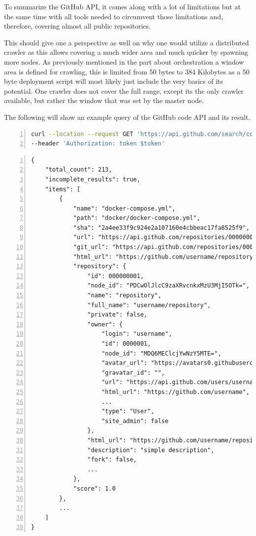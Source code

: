 To summarize the GitHub API, it comes along with a lot of limitations but at the same time with all tools needed to circumvent those limitations and, therefore, covering almost all public repositories.

This should give one a perspective as well on why one would utilize a distributed crawler as this allows covering a much wider area and much quicker by spawning more nodes. As previously mentioned in the part about orchestration a window area is defined for crawling, this is limited from 50 bytes to 384 Kilobytes as a 50 byte deployment script will most likely just include the very basics of its potential. One crawler does not cover the full range, except its the only crawler available, but rather the window that was set by the master node.

The following will show an example query of the GitHub code API and its result.
\begin{lstlisting}[language=bash, caption=GitHub Request, breaklines=true, label=lst:github_request, numbers=left,  basicstyle=\footnotesize\singlespacing]
curl --location --request GET 'https://api.github.com/search/code?q=filename:docker-compose.yml+size=1234&page=1&per_page=100&order=asc&sort=indexed' \
--header 'Authorization: token $token'
\end{lstlisting}
\begin{lstlisting}[caption=GitHub Response, breaklines=true, label=lst:github_response, numbers=left,  basicstyle=\footnotesize\singlespacing]
{
    "total_count": 213,
    "incomplete_results": true,
    "items": [
        {
            "name": "docker-compose.yml",
            "path": "docker/docker-compose.yml",
            "sha": "2a4ee33f9c924e2a107160e4cbbeac17fa8525f9",
            "url": "https://api.github.com/repositories/000000001/contents/docker/docker-compose.yml?ref=f657460284d463a2792f35f50728c74b9a52504e",
            "git_url": "https://api.github.com/repositories/000000001/git/blobs/2a4ee33f9c924e2a107160e4cbbeac17fa8525f9",
            "html_url": "https://github.com/username/repository/blob/f657460284d463a2792f35f50728c74b9a52504e/docker/docker-compose.yml",
            "repository": {
                "id": 000000001,
                "node_id": "PDCwOlJlcC9zaXRvcnkxMzU3MjI5OTk=",
                "name": "repository",
                "full_name": "username/repository",
                "private": false,
                "owner": {
                    "login": "username",
                    "id": 0000001,
                    "node_id": "MDQ6MEClcjYwNzY5MTE=",
                    "avatar_url": "https://avatars0.githubusercontent.com/u/0000001?v=4",
                    "gravatar_id": "",
                    "url": "https://api.github.com/users/username",
                    "html_url": "https://github.com/username",
                    ...
                    "type": "User",
                    "site_admin": false
                },
                "html_url": "https://github.com/username/repository",
                "description": "simple description",
                "fork": false,
                ...
            },
            "score": 1.0
        },
        ...
    ]
}
\end{lstlisting}


